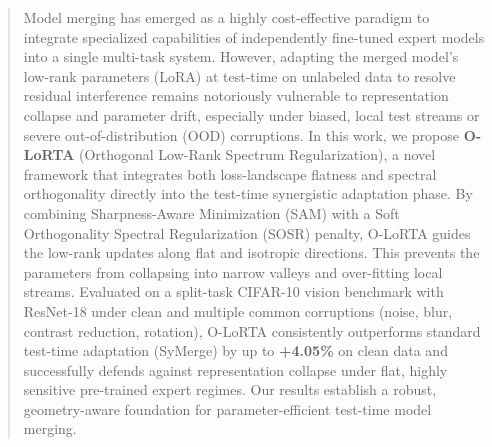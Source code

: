 \documentclass{article}
\theoremstyle{plain}
\theoremstyle{definition}
\theoremstyle{remark}
\begin{document}

\printAffiliationsAndNotice{}

\begin{abstract}
Model merging has emerged as a highly cost-effective paradigm to integrate specialized capabilities of independently fine-tuned expert models into a single multi-task system. However, adapting the merged model's low-rank parameters (LoRA) at test-time on unlabeled data to resolve residual interference remains notoriously vulnerable to representation collapse and parameter drift, especially under biased, local test streams or severe out-of-distribution (OOD) corruptions. In this work, we propose \textbf{O-LoRTA} (Orthogonal Low-Rank Spectrum Regularization), a novel framework that integrates both loss-landscape flatness and spectral orthogonality directly into the test-time synergistic adaptation phase. By combining Sharpness-Aware Minimization (SAM) with a Soft Orthogonality Spectral Regularization (SOSR) penalty, O-LoRTA guides the low-rank updates along flat and isotropic directions. This prevents the parameters from collapsing into narrow valleys and over-fitting local streams. Evaluated on a split-task CIFAR-10 vision benchmark with ResNet-18 under clean and multiple common corruptions (noise, blur, contrast reduction, rotation), O-LoRTA consistently outperforms standard test-time adaptation (SyMerge) by up to \textbf{+4.05\%} on clean data and successfully defends against representation collapse under flat, highly sensitive pre-trained expert regimes. Our results establish a robust, geometry-aware foundation for parameter-efficient test-time model merging.
\end{abstract}
\end{document}
